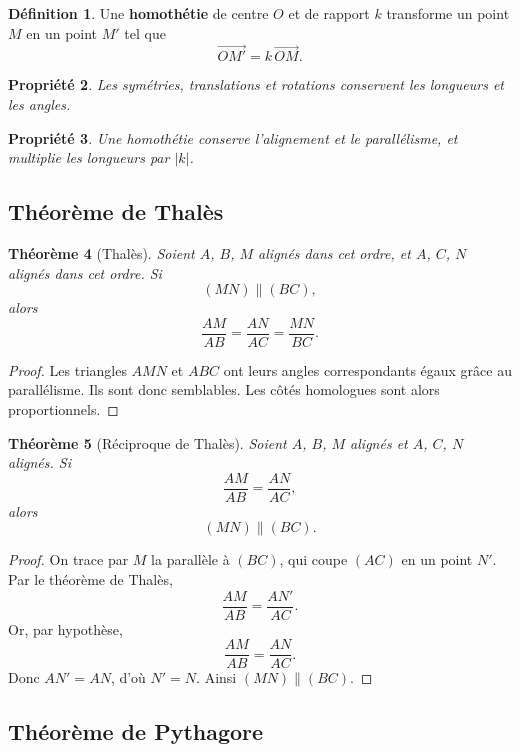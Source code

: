 \documentclass[11pt,a4paper]{article}
\theoremstyle{definition}
\newtheorem{definition}{Définition}[section]
\theoremstyle{plain}
\newtheorem{propriete}[definition]{Propriété}
\newtheorem{theoreme}[definition]{Théorème}
\begin{document}
\begin{definition}
Une \textbf{homothétie} de centre $O$ et de rapport $k$ transforme un point $M$ en un point $M'$ tel que
\[
\overrightarrow{OM'}=k\,\overrightarrow{OM}.
\]
\end{definition}

\begin{propriete}
Les symétries, translations et rotations conservent les longueurs et les angles.
\end{propriete}

\begin{propriete}
Une homothétie conserve l'alignement et le parallélisme, et multiplie les longueurs par $|k|$.
\end{propriete}

\subsection{Théorème de Thalès}

\begin{theoreme}[Thalès]
Soient $A$, $B$, $M$ alignés dans cet ordre, et $A$, $C$, $N$ alignés dans cet ordre.
Si
\[
(MN)\parallel(BC),
\]
alors
\[
\frac{AM}{AB}=\frac{AN}{AC}=\frac{MN}{BC}.
\]
\end{theoreme}

\begin{proof}
Les triangles $AMN$ et $ABC$ ont leurs angles correspondants égaux grâce au parallélisme.
Ils sont donc semblables.
Les côtés homologues sont alors proportionnels.
\end{proof}

\begin{theoreme}[Réciproque de Thalès]
Soient $A$, $B$, $M$ alignés et $A$, $C$, $N$ alignés.
Si
\[
\frac{AM}{AB}=\frac{AN}{AC},
\]
alors
\[
(MN)\parallel(BC).
\]
\end{theoreme}

\begin{proof}
On trace par $M$ la parallèle à $(BC)$, qui coupe $(AC)$ en un point $N'$.
Par le théorème de Thalès,
\[
\frac{AM}{AB}=\frac{AN'}{AC}.
\]
Or, par hypothèse,
\[
\frac{AM}{AB}=\frac{AN}{AC}.
\]
Donc $AN'=AN$, d'où $N'=N$.
Ainsi $(MN)\parallel(BC)$.
\end{proof}

\subsection{Théorème de Pythagore}
\end{document}
